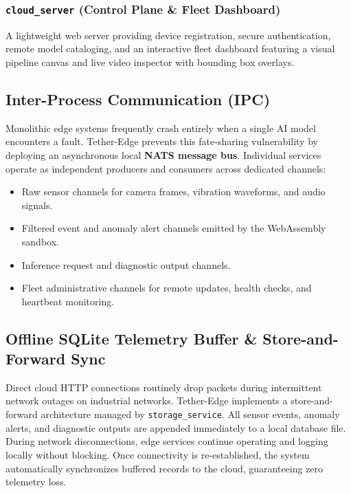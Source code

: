 \documentclass[conference]{IEEEtran}
\begin{document}
    \subsubsection{\texttt{cloud\_server} (Control Plane \& Fleet Dashboard)}
    A lightweight web server providing device registration, secure authentication, remote model cataloging, and an interactive fleet dashboard featuring a visual
    pipeline canvas and live video inspector with bounding box overlays.

    \subsection{Inter-Process Communication (IPC)}
    Monolithic edge systems frequently crash entirely when a single AI model encounters a fault. Tether-Edge prevents this fate-sharing vulnerability by deploying
    an asynchronous local \textbf{NATS message bus}. Individual services operate as independent producers and consumers across dedicated channels:
    \begin{itemize}
        \item Raw sensor channels for camera frames, vibration waveforms, and audio signals.
        \item Filtered event and anomaly alert channels emitted by the WebAssembly sandbox.
        \item Inference request and diagnostic output channels.
        \item Fleet administrative channels for remote updates, health checks, and heartbeat monitoring.
    \end{itemize}

    \subsection{Offline SQLite Telemetry Buffer \& Store-and-Forward Sync}
    Direct cloud HTTP connections routinely drop packets during intermittent network outages on industrial networks. Tether-Edge implements a store-and-forward
    architecture managed by \texttt{storage\_service}. All sensor events, anomaly alerts, and diagnostic outputs are appended immediately to a local database file.
    During network disconnections, edge services continue operating and logging locally without blocking. Once connectivity is re-established, the system
    automatically synchronizes buffered records to the cloud, guaranteeing zero telemetry loss.
\end{document}
